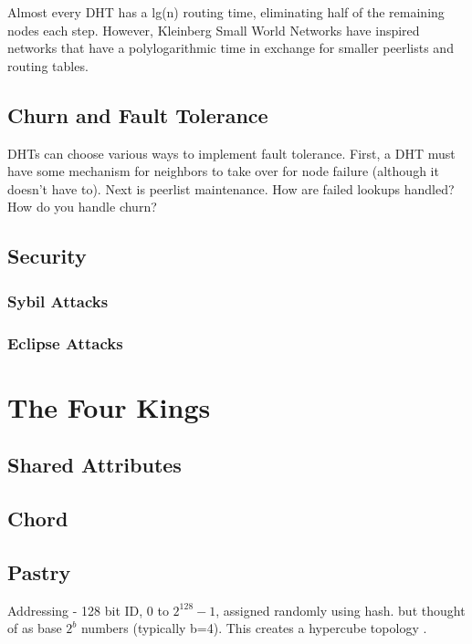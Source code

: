 \documentclass[10pt,letterpaper]{report}
\begin{document}
Almost every DHT has a lg(n) routing time, eliminating  half of the remaining nodes each step.
However, Kleinberg Small World Networks have inspired networks that have a polylogarithmic time in exchange for smaller peerlists and routing tables.


\section{Churn and Fault Tolerance}  %

DHTs can choose various ways to implement fault tolerance.  First, a DHT must have some mechanism for neighbors to take over for node failure (although it doesn't have to).  Next is peerlist maintenance.  How are failed lookups handled?  How do you handle churn?

\section{Security}

\subsection{Sybil Attacks}

\subsection{Eclipse Attacks}

\chapter{The Four Kings}%

\section{Shared Attributes}

\section{Chord}

\section{Pastry}

Addressing - 128 bit ID, 0 to $2^128 -1$, assigned randomly using hash.   but thought of as base $2^b$ numbers (typically b=4).  This creates a hypercube topology \cite{induced}.
\end{document}
